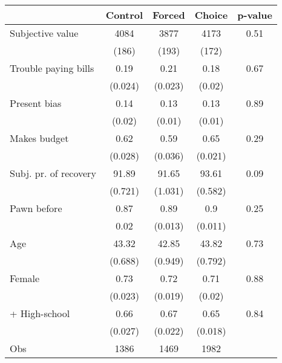 \begin{tabular}{lcccc}
\toprule
& \multicolumn{1}{p{4.5em}}{Control} & \multicolumn{1}{p{4.93em}}{Forced} & \multicolumn{1}{p{3.43em}}{Choice} & \multicolumn{1}{p{3.43em}}{p-value} \\
\midrule
Subjective value & 4084  & 3877  & 4173  & 0.51 \\
      & (186) & (193) & (172) &  \\
Trouble paying bills & 0.19  & 0.21  & 0.18  & 0.67 \\
      & (0.024) & (0.023) & (0.02) &  \\
Present bias & 0.14  & 0.13  & 0.13  & 0.89 \\
      & (0.02) & (0.01) & (0.01) &  \\
Makes budget & 0.62  & 0.59  & 0.65  & 0.29 \\
      & (0.028) & (0.036) & (0.021) &  \\
Subj. pr. of recovery & 91.89 & 91.65 & 93.61 & 0.09 \\
      & (0.721) & (1.031) & (0.582) &  \\
Pawn before & 0.87  & 0.89  & 0.9   & 0.25 \\
      & 0.02  & (0.013) & (0.011) &  \\
Age   & 43.32 & 42.85 & 43.82 & 0.73 \\
      & (0.688) & (0.949) & (0.792) &  \\
Female & 0.73  & 0.72  & 0.71  & 0.88 \\
      & (0.023) & (0.019) & (0.02) &  \\
+ High-school & 0.66  & 0.67  & 0.65  & 0.84 \\
      & (0.027) & (0.022) & (0.018) &  \\
\midrule
Obs   & 1386  & 1469  & 1982  &  \\
\bottomrule
\bottomrule
\end{tabular}%
